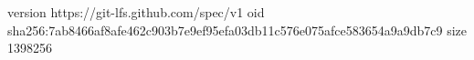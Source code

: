 version https://git-lfs.github.com/spec/v1
oid sha256:7ab8466af8afe462c903b7e9ef95efa03db11c576e075afce583654a9a9db7c9
size 1398256
